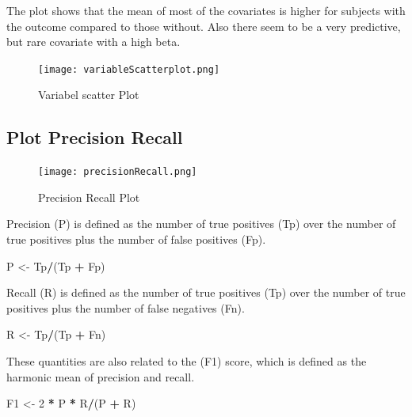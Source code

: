 \documentclass[]{article}
\newenvironment{Shaded}{\begin{snugshade}}{\end{snugshade}}
\newcommand{\DecValTok}[1]{\textcolor[rgb]{0.00,0.00,0.81}{#1}}
\newcommand{\StringTok}[1]{\textcolor[rgb]{0.31,0.60,0.02}{#1}}
\newcommand{\OperatorTok}[1]{\textcolor[rgb]{0.81,0.36,0.00}{\textbf{#1}}}
\newcommand{\NormalTok}[1]{#1}
\begin{document}
The plot shows that the mean of most of the covariates is higher for
subjects with the outcome compared to those without. Also there seem to
be a very predictive, but rare covariate with a high beta.

\begin{figure}
\centering
\texttt{[image: variableScatterplot.png]}
\caption{Variabel scatter Plot}
\end{figure}

\newpage

\subsection{Plot Precision Recall}\label{plot-precision-recall}

\begin{figure}
\centering
\texttt{[image: precisionRecall.png]}
\caption{Precision Recall Plot}
\end{figure}

Precision (P) is defined as the number of true positives (Tp) over the
number of true positives plus the number of false positives (Fp).

\begin{Shaded}
\begin{Highlighting}[]
\NormalTok{P <-}\StringTok{ }\NormalTok{Tp}\OperatorTok{/}\NormalTok{(Tp }\OperatorTok{+}\StringTok{ }\NormalTok{Fp)}
\end{Highlighting}
\end{Shaded}

Recall (R) is defined as the number of true positives (Tp) over the
number of true positives plus the number of false negatives (Fn).

\begin{Shaded}
\begin{Highlighting}[]
\NormalTok{R <-}\StringTok{ }\NormalTok{Tp}\OperatorTok{/}\NormalTok{(Tp }\OperatorTok{+}\StringTok{ }\NormalTok{Fn)}
\end{Highlighting}
\end{Shaded}

These quantities are also related to the (F1) score, which is defined as
the harmonic mean of precision and recall.

\begin{Shaded}
\begin{Highlighting}[]
\NormalTok{F1 <-}\StringTok{ }\DecValTok{2} \OperatorTok{*}\StringTok{ }\NormalTok{P }\OperatorTok{*}\StringTok{ }\NormalTok{R}\OperatorTok{/}\NormalTok{(P }\OperatorTok{+}\StringTok{ }\NormalTok{R)}
\end{Highlighting}
\end{Shaded}
\end{document}
